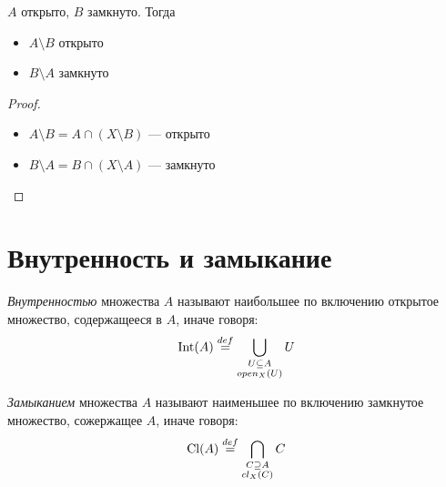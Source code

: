 \begin{theorem}
    $A$ открыто, $B$ замкнуто. Тогда

    \begin{itemize}
        \item $A \setminus B$ открыто
        \item $B \setminus A$ замкнуто
    \end{itemize}
\end{theorem}
\begin{proof}
    \enewline
    \begin{itemize}
        \item $A \setminus B = A \cap (X \setminus B)$ --- открыто
        \item $B \setminus A = B \cap (X \setminus A)$ --- замкнуто
    \end{itemize}
\end{proof}

\section{Внутренность и замыкание}

\begin{definition}
    \textit{Внутренностью} множества $A$ называют наибольшее по включению
    открытое множество, содержащееся в $A$, иначе говоря:
\[
    \operatorname{Int}(A) \overset{def}{\underset{}{=}} \bigcup_{\substack{U \subseteq A \\open_X(U)}}{U}
\]
\end{definition}

\begin{definition}
    \textit{Замыканием} множества $A$ называют наименьшее по включению
    замкнутое множество, сожержащее $A$, иначе говоря:
\[
    \operatorname{Cl}(A) \overset{def}{\underset{}{=}} \bigcap_{\substack{C \supseteq A \\cl_X(C)}}{C}
\]
\end{definition}

